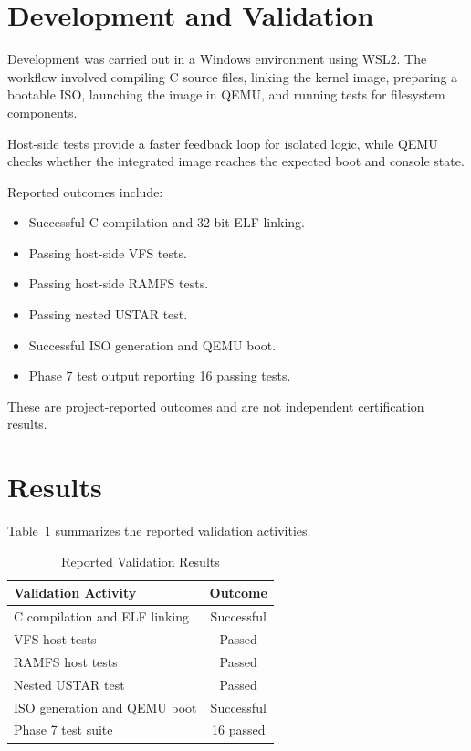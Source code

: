 \documentclass[conference]{IEEEtran}
\begin{document}
\section{Development and Validation}

Development was carried out in a Windows environment using
WSL2. The workflow involved compiling C source files, linking
the kernel image, preparing a bootable ISO, launching the
image in QEMU, and running tests for filesystem components.

Host-side tests provide a faster feedback loop for isolated
logic, while QEMU checks whether the integrated image reaches
the expected boot and console state.

Reported outcomes include:

\begin{itemize}
    \item Successful C compilation and 32-bit ELF linking.
    \item Passing host-side VFS tests.
    \item Passing host-side RAMFS tests.
    \item Passing nested USTAR test.
    \item Successful ISO generation and QEMU boot.
    \item Phase 7 test output reporting 16 passing tests.
\end{itemize}

These are project-reported outcomes and are not independent
certification results.

\section{Results}

Table~\ref{tab:results} summarizes the reported validation
activities.

\begin{table}[!t]
\centering
\caption{Reported Validation Results}
\label{tab:results}

\begin{tabular}{|p{}|c|}
\hline
\textbf{Validation Activity} & \textbf{Outcome}\\
\hline
C compilation and ELF linking & Successful\\
\hline
VFS host tests & Passed\\
\hline
RAMFS host tests & Passed\\
\hline
Nested USTAR test & Passed\\
\hline
ISO generation and QEMU boot & Successful\\
\hline
Phase 7 test suite & 16 passed\\
\hline
\end{tabular}
\end{table}
\end{document}
